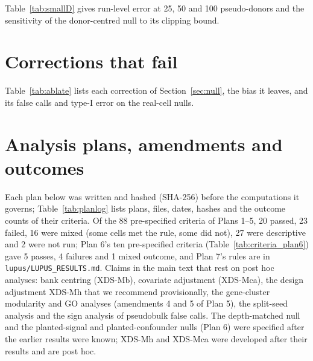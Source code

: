




Table~\ref{tab:smallD} gives run-level error at 25, 50 and 100 pseudo-donors and the sensitivity of the donor-centred null to its clipping bound.



\section{Corrections that fail}\label{app:ablate}



Table~\ref{tab:ablate} lists each correction of Section~\ref{sec:null}, the bias it leaves, and its false calls and type-I error on the real-cell nulls.





\section{Analysis plans, amendments and outcomes}\label{app:prereg}

Each plan below was written and hashed (SHA-256) before the computations it governs; Table~\ref{tab:planlog} lists plans, files, dates, hashes and the outcome counts of their criteria. Of the 88 pre-specified criteria of Plans 1--5, 20 passed, 23 failed, 16 were mixed (some cells met the rule, some did not), 27 were descriptive and 2 were not run; Plan 6's ten pre-specified criteria (Table~\ref{tab:criteria_plan6}) gave 5 passes, 4 failures and 1 mixed outcome, and Plan 7's rules are in \texttt{lupus/LUPUS\_RESULTS.md}. Claims in the main text that rest on post hoc analyses: bank centring (XDS-Mb), covariate adjustment (XDS-Mca), the design adjustment XDS-Mh that we recommend provisionally, the gene-cluster modularity and GO analyses (amendments 4 and 5 of Plan 5), the split-seed analysis and the sign analysis of pseudobulk false calls. The depth-matched null and the planted-signal and planted-confounder nulls (Plan 6) were specified after the earlier results were known; XDS-Mh and XDS-Mca were developed after their results and are post hoc.

